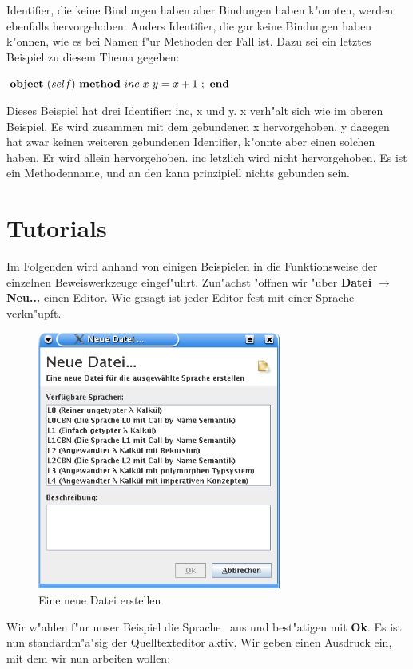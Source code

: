 Identifier, die keine Bindungen haben aber Bindungen haben k"onnten, werden ebenfalls hervorgehoben. 
Anders Identifier, die gar keine Bindungen haben k"onnen, wie es bei Namen f"ur Methoden der Fall ist. 
Dazu sei ein letztes Beispiel zu diesem Thema gegeben:

$\object{self}{\curriedmethodtwo{inc}{x}{y}{\infix{+}{x}{1}}}$

Dieses Beispiel hat drei Identifier: inc, x und y. x verh"alt sich wie im oberen Beispiel. 
Es wird zusammen mit dem gebundenen x hervorgehoben. y dagegen hat zwar keinen weiteren gebundenen Identifier, 
k"onnte aber einen solchen haben. Er wird allein hervorgehoben. inc letzlich wird nicht hervorgehoben. 
Es ist ein Methodenname, und an den kann prinzipiell nichts gebunden sein.

\section {Tutorials}
Im Folgenden wird anhand von einigen Beispielen in die
Funktionsweise der einzelnen Beweiswerkzeuge eingef"uhrt. Zun"achst
"offnen wir "uber {\bf Datei} $\rightarrow$ {\bf Neu...} einen
Editor. Wie gesagt ist jeder Editor fest mit einer Sprache
verkn"upft.

\begin{figure}[h]
\begin{center}
\includegraphics[width=8cm]{images/new-dialog.png}
\caption{Eine neue Datei erstellen}
\end{center}
\end{figure}

Wir w"ahlen f"ur unser Beispiel die Sprache \LONE\ aus und best"atigen
mit {\bf Ok}. Es ist nun standardm"a"sig der Quelltexteditor aktiv.
Wir geben einen Ausdruck ein, mit dem wir nun arbeiten wollen:

